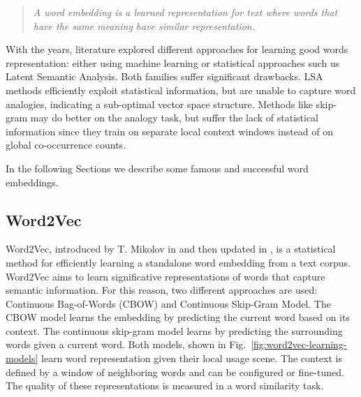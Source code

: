 \begin{quote}
  \textit{A word embedding is a learned representation for text where
  words that have the same meaning have similar representation.}
\end{quote}

With the years, literature explored different approaches for learning
good words representation: either using machine learning or
statistical approaches such us Latent Semantic Analysis. Both families
suffer significant drawbacks. LSA methods efficiently exploit
statistical information, but are unable to capture word analogies,
indicating a sub-optimal vector space structure. Methods like
skip-gram may do better on the analogy task, but suffer the lack of
statistical information since they train on separate local context
windows instead of on global co-occurrence counts.

In the following Sections we describe some famous and successful word
embeddings.

\subsection{Word2Vec}

Word2Vec, introduced by T. Mikolov in \cite{mikolov2013efficient} and
then updated in \cite{mikolov2013distributed, mikolov2013linguistic},
is a statistical method for efficiently learning a standalone word
embedding from a text corpus. Word2Vec aims to learn significative
representations of words that capture semantic information. For this
reason, two different approaches are used: Continuous Bag-of-Words
(CBOW) and Continuous Skip-Gram Model. The CBOW model learns the
embedding by predicting the current word based on its context. The
continuous skip-gram model learns by predicting the surrounding words
given a current word. Both models, shown in
Fig.~\ref{fig:word2vec-learning-models} learn word representation
given their local usage scene. The context is defined by a window of
neighboring words and can be configured or fine-tuned. The quality of
these representations is measured in a word similarity task.

